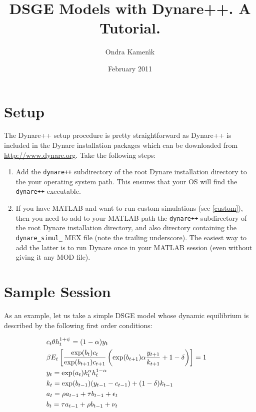 \documentclass[10pt]{article}
\begin{document}
\title{DSGE Models with Dynare++. A Tutorial.}

\author{Ondra Kamen\'\i k}

\date{February 2011}
\maketitle

\tableofcontents

\section{Setup}

The Dynare++ setup procedure is pretty straightforward as Dynare++ is included in the Dynare installation 
packages which can be downloaded from \url{http://www.dynare.org}. Take the following steps:
\begin{enumerate}
\item Add the {\tt dynare++} subdirectory of the root Dynare installation directory to the your
operating system path. This ensures that your OS will find the {\tt dynare++} executable.
\item If you have MATLAB and want to run custom simulations (see \ref{custom}),
  then you need to add to your MATLAB path the {\tt dynare++} subdirectory of
  the root Dynare installation directory, and also directory containing the
  \texttt{dynare\_simul\_} MEX file (note the trailing underscore). The easiest
  way to add the latter is to run Dynare once in your MATLAB session (even
  without giving it any MOD file).
\end{enumerate}

\section{Sample Session}

As an example, let us take a simple DSGE model whose dynamic
equilibrium is described by the following first order conditions:

\begin{align*}
&c_t\theta h_t^{1+\psi} = (1-\alpha)y_t\cr
&\beta E_t\left[\frac{\exp(b_t)c_t}{\exp(b_{t+1})c_{t+1}}
\left(\exp(b_{t+1})\alpha\frac{y_{t+1}}{k_{t+1}}+1-\delta\right)\right]=1\cr
&y_t=\exp(a_t)k_t^\alpha h_t^{1-\alpha}\cr
&k_{t}=\exp(b_{t-1})(y_{t-1}-c_{t-1})+(1-\delta)k_{t-1}\cr
&a_t=\rho a_{t-1}+\tau b_{t-1}+\epsilon_t\cr
&b_t=\tau a_{t-1}+\rho b_{t-1}+\nu_t
\end{align*}
\end{document}
